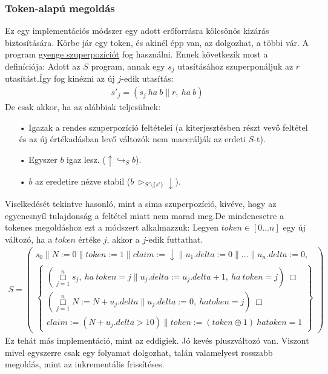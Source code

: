 \documentclass{article}
\newcommand{\loopBox}{\overset{n}{\underset{j=1}{\Box}}}
\newcommand{\false}{\downarrow}
\newcommand{\true}{\uparrow}
\newcommand{\pp}{\parallel}
\begin{document}
\subsubsection*{Token-alapú megoldás}
Ez egy implementációs módszer egy adott erőforrásra kölcsönös kizárás biztosítására. Körbe jár egy token, és akinél épp van, az dolgozhat, a többi vár. A program \underline{gyenge szuperpozíciót} fog használni. Ennek következik most a definíciója: Adott az $S$ program, annak egy $s_j$ utasításához szuperponáljuk az $r$ utasítást.Így fog kinézni az új $j$-edik utasítás:
\begin{align*}
s'_j = (s_j\ ha\ b \pp r,\ ha\ b)
\end{align*}
De csak akkor, ha az alábbiak teljesülnek:
\begin{enumerate}
\item[•]Igazak a rendes szuperpozíció feltételei (a kiterjesztésben részt vevő feltétel és az új értékadásban levő változók nem macerálják az erdeti $S$-t).
\item[•]Egyszer $b$ igaz lesz. ($\true \hookrightarrow_S b$).
\item[•]$b$ az eredetire nézve stabil ($b\ \triangleright_{S' \setminus \lbrace s' \rbrace} \false$).
\end{enumerate}
Viselkedését tekintve hasonló, mint a sima szuperpozíció, kivéve, hogy az egyenesnyíl tulajdonság a feltétel miatt nem marad meg.De mindenesetre a tokenes megoldáshoz ezt a módszert alkalmazzuk: Legyen $token \in [0\dots n]$ egy új változó, ha a $token$ értéke $j$, akkor a $j$-edik futtathat.
\begin{align*}
S=\left( \begin{array}{l}
s_0\pp N:=0 \pp token:=1 \pp claim:=\false \pp u_1.delta := 0 \pp \dots \pp u_n.delta:=0,\\
\left\{ \begin{array}{l}
(\loopBox s_j,\ ha\ token=j \pp u_j.delta := u_j.delta+1,\ ha\ token = j)\ \Box\\
(\loopBox N:=N+u_j.delta \pp u_j.delta:=0,\ ha token=j)\ \Box\\
claim:=(N+u_j.delta > 10) \pp token:=(token \oplus 1)\ ha token=1
\end{array}\right\}
\end{array}\right)
\end{align*}
Ez tehát más implementáció, mint az eddigiek. Jó kevés pluszváltozó van. Viszont mivel egyszerre csak egy folyamat
dolgozhat, talán valamelyest rosszabb megoldás, mint az inkrementális frissítéses.
\end{document}
